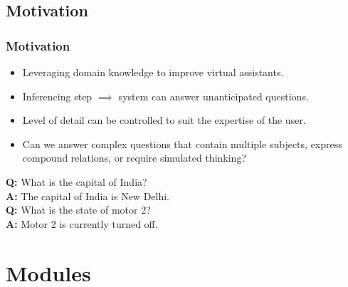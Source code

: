 \documentclass[t]{beamer}
\begin{document}
\subsection{Motivation}
\begin{frame}
    \frametitle{Motivation}
    \begin{itemize}
    \item Leveraging domain knowledge to improve virtual assistants.
    \item Inferencing step $\implies$ system can answer unanticipated questions.
    \item Level of detail can be controlled to suit the expertise of the user.
    \item Can we answer complex questions that contain multiple subjects, express compound relations, or require simulated thinking?
    \end{itemize}
    
    \begin{example}
    \textbf{Q:} What is the capital of India?\\
    \textbf{A:} The capital of India is New Delhi.\\
    \textbf{Q:} What is the state of motor 2?\\
    \textbf{A:} Motor 2 is currently turned off.
    \end{example}
\end{frame}

\section{Modules}
\end{document}
